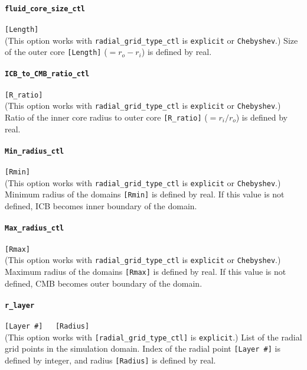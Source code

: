 \paragraph{\tt fluid\_core\_size\_ctl}
\label{href_t:fluid_core_size_ctl}
\verb|[Length]| \\
(This option works with \verb|radial_grid_type_ctl| is {\tt explicit} or {\tt Chebyshev}.)
Size of the outer core \verb|[Length]| ($ = r_{o}-r_{i}$) is defined by real.

\paragraph{\tt ICB\_to\_CMB\_ratio\_ctl}
\label{href_t:ICB_to_CMB_ratio_ctl} 
\verb|[R_ratio]| \\
(This option works with \verb|radial_grid_type_ctl| is {\tt explicit} or {\tt Chebyshev}.)
Ratio of the inner core radius to outer core \verb|[R_ratio]| ($ = r_{i} / r_{o}$) is defined by real.

\paragraph{\tt Min\_radius\_ctl}
\label{href_t:Min_radius_ctl}
\verb|[Rmin]| \\
(This option works with \verb|radial_grid_type_ctl| is {\tt explicit} or {\tt Chebyshev}.)
Minimum radius of the domains \verb|[Rmin]| is defined by real. If this value is not defined, ICB becomes inner boundary of the domain.

\paragraph{\tt Max\_radius\_ctl }
\label{href_t:Max_radius_ctl} 
\verb|[Rmax]| \\
(This option works with \verb|radial_grid_type_ctl| is {\tt explicit} or {\tt Chebyshev}.)
Maximum radius of the domains \verb|[Rmax]| is defined by real. If this value is not defined, CMB becomes outer boundary of the domain.

\paragraph{\tt r\_layer}
\label{href_t:r_layer}
\verb|[Layer #]   [Radius]| \\
(This option works with \verb|[radial_grid_type_ctl]| is {\tt explicit}.)
List of the radial grid points in the simulation domain. Index of the radial point \verb|[Layer #]| is defined by integer, and radius \verb|[Radius]| is defined by real.


